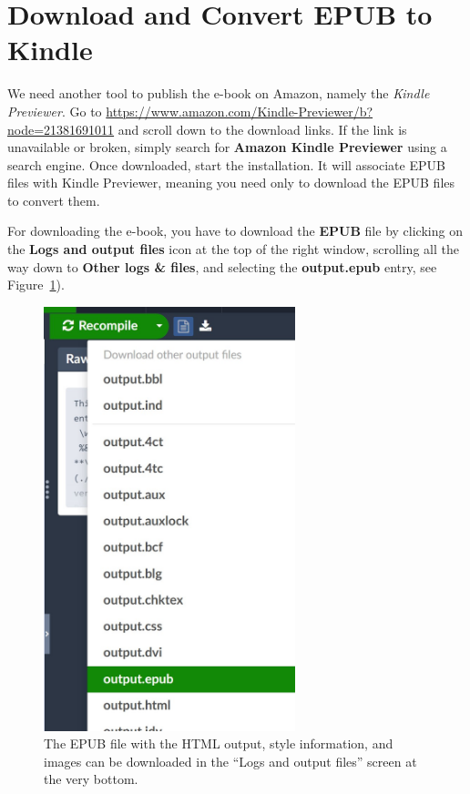 \section{Download and Convert EPUB to Kindle}\label{converthtmltokindle:sec}

We need another tool to publish the e-book on Amazon, namely the \textit{Kindle Previewer}. Go to \url{https://www.amazon.com/Kindle-Previewer/b?node=21381691011} and scroll down to the download links. If the link is unavailable or broken, simply search for \textbf{Amazon Kindle Previewer} using a search engine. Once downloaded, start the installation. It will associate EPUB files with Kindle Previewer, meaning you need only to download the EPUB files to convert them.



For downloading the e-book, you have to download the \textbf{EPUB} file by clicking on the \textbf{Logs and output files} icon at the top of the right window, scrolling all the way down to \textbf{Other logs \& files}, and selecting the \textbf{output.epub} entry, see Figure~\ref{downloadepub:fig}). 

\begin{figure}[H]\centering
\includegraphics[width=0.65\textwidth]{images/downloadEPUB.jpg}
\caption{The EPUB file with the HTML output, style information, and images can be downloaded in the ``Logs and output files'' screen at the very bottom.}
\label{downloadepub:fig}
\end{figure}

